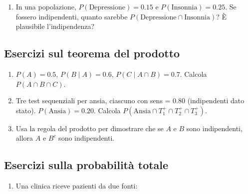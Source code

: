 \documentclass[
  italian,
  letterpaper,
  a4paper,
  11pt,
  open=any]{scrbook}
\providecommand{\tightlist}{%
  \setlength{\itemsep}{0pt}\setlength{\parskip}{0pt}}
\theoremstyle{plain}
\theoremstyle{definition}
\theoremstyle{definition}
\theoremstyle{remark}
\begin{document}
\begin{tcolorbox}
\begin{enumerate}
  \begin{itemize}
  \tightlist
  \item
    \(A\) = ``Prima moneta è testa''
  \item
    \(B\) = ``Almeno una testa''
  \end{itemize}

  \begin{enumerate}
  \def\labelenumii{\alph{enumii}.}
  \tightlist
  \item
    Costruisci tabella congiunta
  \item
    Calcola \(P(A \mid B)\)
  \item
    \(A\) e \(B\) sono indipendenti?
  \end{enumerate}
\item
  In una popolazione, \(P(\text{Depressione}) = 0.15\) e
  \(P(\text{Insonnia}) = 0.25\). Se fossero indipendenti, quanto sarebbe
  \(P(\text{Depressione} \cap \text{Insonnia})\)? È plausibile
  l'indipendenza?
\end{enumerate}

\subsection*{Esercizi sul teorema del
prodotto}\label{esercizi-sul-teorema-del-prodotto}

\begin{enumerate}
\def\labelenumi{\arabic{enumi}.}
\setcounter{enumi}{11}
\item
  \(P(A) = 0.5\), \(P(B \mid A) = 0.6\), \(P(C \mid A \cap B) = 0.7\).
  Calcola \(P(A \cap B \cap C)\).
\item
  Tre test sequenziali per ansia, ciascuno con sens = 0.80 (indipendenti
  dato stato). \(P(\text{Ansia}) = 0.20\). Calcola
  \(P(\text{Ansia} \cap T_1^+ \cap T_2^+ \cap T_3^+)\).
\item
  Usa la regola del prodotto per dimostrare che se \(A\) e \(B\) sono
  indipendenti, allora \(A\) e \(B^c\) sono indipendenti.
\end{enumerate}

\subsection*{Esercizi sulla probabilità
totale}\label{esercizi-sulla-probabilituxe0-totale}

\begin{enumerate}
\def\labelenumi{\arabic{enumi}.}
\setcounter{enumi}{14}
\item
  Una clinica riceve pazienti da due fonti:


\end{enumerate}
\end{tcolorbox}
\end{document}
